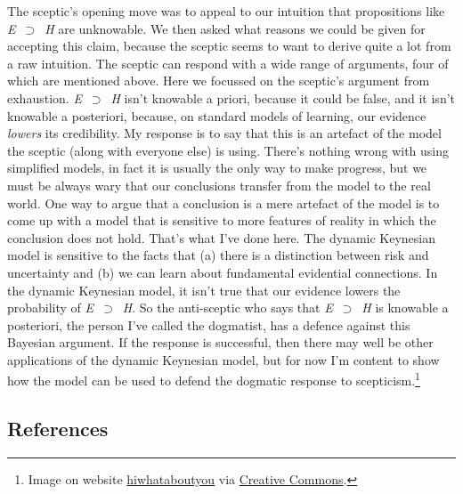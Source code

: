 \documentclass[
  11pt,
  letterpaper,
  DIV=11,
  numbers=noendperiod,
  oneside]{scrartcl}
\begin{document}
The sceptic's opening move was to appeal to our intuition that
propositions like \emph{E}~\({\supset}\)~\emph{H} are unknowable. We
then asked what reasons we could be given for accepting this claim,
because the sceptic seems to want to derive quite a lot from a raw
intuition. The sceptic can respond with a wide range of arguments, four
of which are mentioned above. Here we focussed on the sceptic's argument
from exhaustion. \emph{E}~\({\supset}\)~\emph{H} isn't knowable a
priori, because it could be false, and it isn't knowable a posteriori,
because, on standard models of learning, our evidence \emph{lowers} its
credibility. My response is to say that this is an artefact of the model
the sceptic (along with everyone else) is using. There's nothing wrong
with using simplified models, in fact it is usually the only way to make
progress, but we must be always wary that our conclusions transfer from
the model to the real world. One way to argue that a conclusion is a
mere artefact of the model is to come up with a model that is sensitive
to more features of reality in which the conclusion does not hold.
That's what I've done here. The dynamic Keynesian model is sensitive to
the facts that (a) there is a distinction between risk and uncertainty
and (b) we can learn about fundamental evidential connections. In the
dynamic Keynesian model, it isn't true that our evidence lowers the
probability of \emph{E}~\({\supset}\)~\emph{H}. So the anti-sceptic who
says that \emph{E}~\({\supset}\)~\emph{H} is knowable a posteriori, the
person I've called the dogmatist, has a defence against this Bayesian
argument. If the response is successful, then there may well be other
applications of the dynamic Keynesian model, but for now I'm content to
show how the model can be used to defend the dogmatic response to
scepticism.\footnote{Image on website
  \href{https://www.flickr.com/photos/102148845@N07}{hiwhataboutyou} via
  \href{https://search.creativecommons.org/photos/2490c26c-ce0e-46ce-b4cd-16dfb3fe063b}{Creative
  Commons}.}

\subsection*{References}\label{references}
\end{document}
